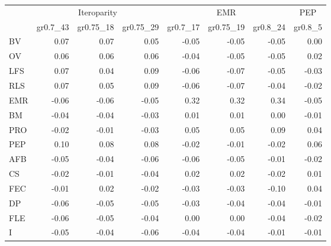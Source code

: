 \begin{landscape}
\begin{table}
\begin{footnotesize}
\begin{tabular}{@{}l|rrr|rrr|r@{}}
\toprule
 & \multicolumn{3}{c|}{Iteroparity} & \multicolumn{3}{c|}{EMR} & \multicolumn{1}{c}{PEP}\\
 & gr0.7\_43 & gr0.75\_18 & gr0.75\_29 & gr0.7\_17 & gr0.75\_19 & gr0.8\_24 & gr0.8\_5\\
\midrule
BV & 0.07 & 0.07 & 0.05 & -0.05 & -0.05 & -0.05 & 0.00\\
OV & 0.06 & 0.06 & 0.06 & -0.04 & -0.05 & -0.05 & 0.02\\
LFS & 0.07 & 0.04 & 0.09 & -0.06 & -0.07 & -0.05 & -0.03\\
RLS & 0.07 & 0.05 & 0.09 & -0.06 & -0.07 & -0.04 & -0.02\\
EMR & -0.06 & -0.06 & -0.05 & 0.32 & 0.32 & 0.34 & -0.05\\
BM & -0.04 & -0.04 & -0.03 & 0.01 & 0.01 & 0.00 & -0.01\\
PRO & -0.02 & -0.01 & -0.03 & 0.05 & 0.05 & 0.09 & 0.04\\
PEP & 0.10 & 0.08 & 0.08 & -0.02 & -0.01 & -0.02 & 0.06\\
AFB & -0.05 & -0.04 & -0.06 & -0.06 & -0.05 & -0.01 & -0.02\\
CS & -0.02 & -0.01 & -0.04 & 0.02 & 0.02 & -0.02 & 0.01\\
FEC & -0.01 & 0.02 & -0.02 & -0.03 & -0.03 & -0.10 & 0.04\\
DP & -0.06 & -0.05 & -0.05 & -0.03 & -0.04 & -0.04 & -0.01\\
FLE & -0.06 & -0.05 & -0.04 & 0.00 & 0.00 & -0.04 & -0.02\\
I & -0.05 & -0.04 & -0.06 & -0.04 & -0.04 & -0.01 & -0.01\\
\bottomrule
\end{tabular}
\end{footnotesize}
\end{table}

\end{landscape}%


